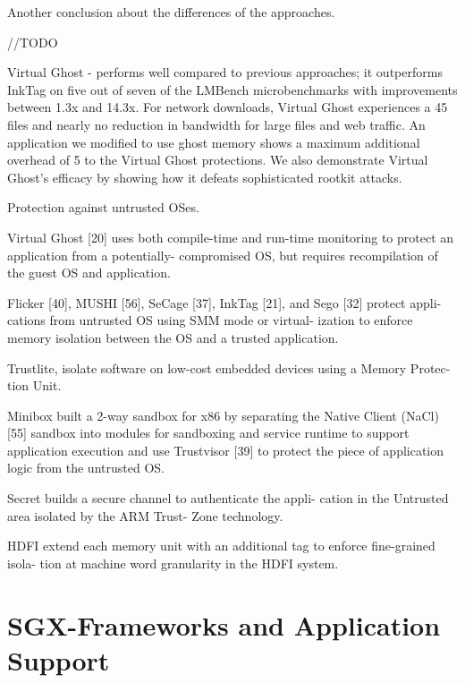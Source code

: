 Another conclusion about the differences of the approaches. 
 
//TODO

Virtual Ghost - 
performs well compared to previous approaches; it outperforms InkTag on five out of seven of the
LMBench microbenchmarks with improvements between
1.3x and 14.3x. For network downloads, Virtual Ghost experiences a 45%
files and nearly no reduction in bandwidth for large files
and web traffic. An application we modified to use ghost
memory shows a maximum additional overhead of 5%
to the Virtual Ghost protections. We also demonstrate Virtual Ghost’s efficacy by showing how it defeats sophisticated
rootkit attacks.

Protection against untrusted OSes.

Virtual Ghost [20] uses both compile-time and run-time
monitoring to protect an application from a potentially-
compromised OS, but requires recompilation of the
guest OS and application.

Flicker [40], MUSHI [56],
SeCage [37], InkTag [21], and Sego [32] protect appli-
cations from untrusted OS using SMM mode or virtual-
ization to enforce memory isolation between the OS and
a trusted application.

Trustlite, isolate software
on low-cost embedded devices using a Memory Protec-
tion Unit.

Minibox built a 2-way sandbox for x86
by separating the Native Client (NaCl) [55] sandbox into
modules for sandboxing and service runtime to support
application execution and use Trustvisor [39] to protect
the piece of application logic from the untrusted OS.

Secret builds a secure channel to authenticate the appli-
cation in the Untrusted area isolated by the ARM Trust-
Zone technology.

HDFI extend each memory
unit with an additional tag to enforce fine-grained isola-
tion at machine word granularity in the HDFI system.








\section{SGX-Frameworks and Application Support} %
\label{sec:sgx_frameworks}


